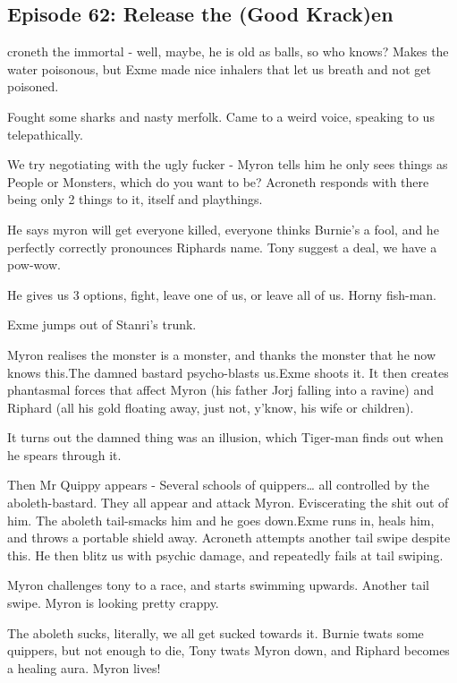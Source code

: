 \subsection{Episode 62: Release the (Good Krack)en}

croneth the immortal - well, maybe, he is old as balls, so who knows? Makes the water poisonous, but Exme made nice inhalers that let us breath and not get poisoned.\medskip

Fought some sharks and nasty merfolk. Came to a weird voice, speaking to us telepathically.\medskip

We try negotiating with the ugly fucker - Myron tells him he only sees things as People or Monsters, which do you want to be? Acroneth responds with there being only 2 things to it, itself and playthings.\medskip

He says myron will get everyone killed, everyone thinks Burnie’s a fool, and he perfectly correctly pronounces Riphards name. Tony suggest a deal, we have a pow-wow.\medskip

He gives us 3 options, fight, leave one of us, or leave all of us. Horny fish-man.\medskip

Exme jumps out of Stanri’s trunk.\medskip

Myron realises the monster is a monster, and thanks the monster that he now knows this.The damned bastard psycho-blasts us.Exme shoots it. It then creates phantasmal forces that affect Myron (his father Jorj falling into a ravine) and Riphard (all his gold floating away, just not, y’know, his wife or children).\medskip

It turns out the damned thing was an illusion, which Tiger-man finds out when he spears through it.\medskip

Then Mr Quippy appears - Several schools of quippers… all controlled by the aboleth-bastard. They all appear and attack Myron. Eviscerating the shit out of him. The aboleth tail-smacks him and he goes down.Exme runs in, heals him, and throws a portable shield away. Acroneth attempts another tail swipe despite this. He then blitz us with psychic damage, and repeatedly fails at tail swiping.\medskip

Myron challenges tony to a race, and starts swimming upwards. Another tail swipe. Myron is looking pretty crappy.\medskip

The aboleth sucks, literally, we all get sucked towards it. Burnie twats some quippers, but not enough to die, Tony twats Myron down, and Riphard becomes a healing aura. Myron lives!\medskip


